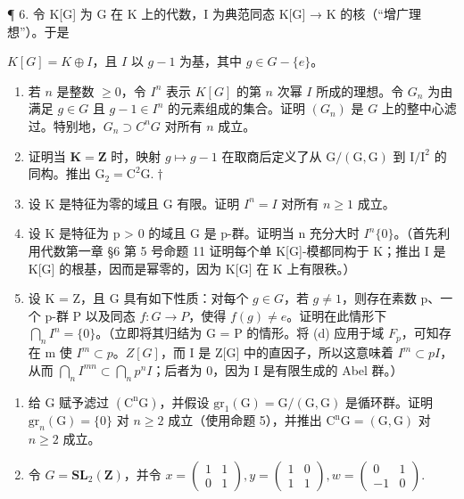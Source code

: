 ¶ 6. 令 K{[}G{]} 为 G 在 K 上的代数，I 为典范同态 K{[}G{]} → K 的核（“增广理想”）。于是


\(K[G] = K \oplus I\)，且 \(I\) 以 \(g - 1\) 为基，其中 \(g \in G - \{e\}\)。

\begin{enumerate}
\def\labelenumi{(\alph{enumi})}
\item
  若 \(n\) 是整数 \(\geqslant 0\)，令 \(I^n\) 表示 \(K[G]\) 的第 \(n\) 次幂 \(I\) 所成的理想。令 \(G_n\) 为由满足 \(g \in G\) 且 \(g - 1 \in I^n\) 的元素组成的集合。证明 \((G_n)\) 是 \(G\) 上的整中心滤过。特别地，\(G_n \supset C^n G\) 对所有 \(n\) 成立。
\item
  证明当 \(\mathbf{K} = \mathbf{Z}\) 时，映射 \(g \mapsto g - 1\) 在取商后定义了从 \(\mathrm{G} / (\mathrm{G}, \mathrm{G})\) 到 \(\mathrm{I} / \mathrm{I}^2\) 的同构。推出 \(\mathrm{G}_2 = \mathrm{C}^2\mathrm{G}.\dagger\)
\item
  设 K 是特征为零的域且 G 有限。证明 \(I^{n} = I\) 对所有 \(n \geqslant 1\) 成立。
\item
  设 K 是特征为 p \textgreater{} 0 的域且 G 是 p-群。证明当 n 充分大时 \(I^{n}\{0\}\)。（首先利用代数第一章 §6 第 5 号命题 11 证明每个单 K{[}G{]}-模都同构于 K；推出 I 是 K{[}G{]} 的根基，因而是幂零的，因为 K{[}G{]} 在 K 上有限秩。）
\item
  设 K = Z，且 G 具有如下性质：对每个 \(g \in G\)，若 \(g \neq 1\)，则存在素数 p、一个 p-群 P 以及同态 \(f: G \to P\)，使得 \(f(g) \neq e\)。证明在此情形下 \(\bigcap_{n} I^{n} = \{0\}\)。（立即将其归结为 G = P 的情形。将 (d) 应用于域 \(F_{p}\)，可知存在 m 使 \(I^{m} \subset p\)。\(Z[G]\)，而 I 是 Z{[}G{]} 中的直因子，所以这意味着 \(I^{m} \subset pI\)，从而 \(\bigcap_{n} I^{mn} \subset \bigcap_{n} p^{n}I\)；后者为 0，因为 I 是有限生成的 Abel 群。）
\end{enumerate}

\begin{enumerate}
\def\labelenumi{\arabic{enumi}.}
\setcounter{enumi}{6}
\item
  给 G 赋予滤过 \((\mathrm{C}^{\mathrm{n}}\mathrm{G})\)，并假设 \(\mathrm{gr}_{1}(\mathrm{G}) = \mathrm{G}/(\mathrm{G}, \mathrm{G})\) 是循环群。证明 \(\mathrm{gr}_{n}(\mathrm{G}) = \{0\}\) 对 \(n \geqslant 2\) 成立（使用命题 5），并推出 \(\mathrm{C}^{\mathrm{n}}\mathrm{G} = (\mathrm{G}, \mathrm{G})\) 对 \(n \geqslant 2\) 成立。
\item
  令 \(G = \mathbf{S}\mathbf{L}_{2}(\mathbf{Z})\)，并令 \(x = \begin{pmatrix} 1 & 1 \\ 0 & 1 \end{pmatrix}, y = \begin{pmatrix} 1 & 0 \\ 1 & 1 \end{pmatrix}, w = \begin{pmatrix} 0 & 1 \\ -1 & 0 \end{pmatrix}.\)
\end{enumerate}

